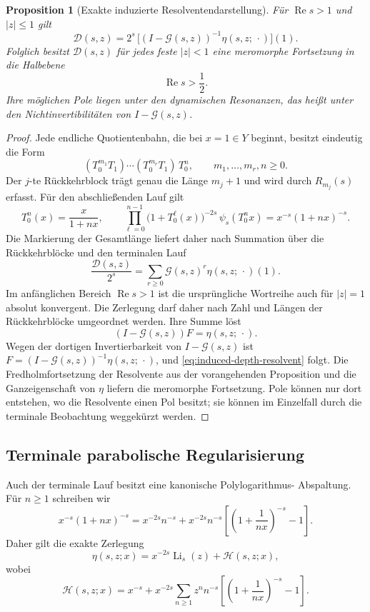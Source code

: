 \documentclass[11pt,a4paper]{article}
\newtheorem{proposition}[remark]{Proposition}
\begin{document}
\begin{proposition}[Exakte induzierte Resolventendarstellung]
Für $\operatorname{Re}s>1$ und $|z|\le1$ gilt
\begin{equation}\label{eq:induced-depth-resolvent}
 \mathscr D(s,z)
 =
 2^s\,
 \bigl[(I-\mathcal G(s,z))^{-1}\eta(s,z;\,\cdot)\bigr](1).
\end{equation}
Folglich besitzt $\mathscr D(s,z)$ für jedes feste $|z|<1$ eine
meromorphe Fortsetzung in die Halbebene
\[
 \operatorname{Re}s>\frac12.
\]
Ihre möglichen Pole liegen unter den dynamischen Resonanzen, das heißt
unter den Nichtinvertibilitäten von $I-\mathcal G(s,z)$.
\end{proposition}

\begin{proof}
Jede endliche Quotientenbahn, die bei $x=1\in Y$ beginnt, besitzt
eindeutig die Form
\[
 (T_0^{m_1}T_1)\cdots(T_0^{m_r}T_1)\,T_0^n,
 \qquad m_1,\ldots,m_r,n\ge0.
\]
Der $j$-te Rückkehrblock trägt genau die Länge $m_j+1$ und wird durch
$R_{m_j}(s)$ erfasst. Für den abschließenden Lauf gilt
\[
 T_0^n(x)=\frac{x}{1+nx},
 \qquad
 \prod_{\ell=0}^{n-1}
  \bigl(1+T_0^\ell(x)\bigr)^{-2s}
 \,\psi_s(T_0^n x)
 =
 x^{-s}(1+nx)^{-s}.
\]
Die Markierung der Gesamtlänge liefert daher nach Summation über die
Rückkehrblöcke und den terminalen Lauf
\[
 \frac{\mathscr D(s,z)}{2^s}
 =
 \sum_{r\ge0}\mathcal G(s,z)^r\eta(s,z;\,\cdot)(1).
\]
Im anfänglichen Bereich $\operatorname{Re}s>1$ ist die ursprüngliche
Wortreihe auch für $|z|=1$ absolut konvergent. Die Zerlegung darf daher nach Zahl und
Längen der Rückkehrblöcke umgeordnet werden. Ihre Summe löst
\[
 (I-\mathcal G(s,z))F=\eta(s,z;\,\cdot).
\]
Wegen der dortigen Invertierbarkeit von $I-\mathcal G(s,z)$ ist
$F=(I-\mathcal G(s,z))^{-1}\eta(s,z;\,\cdot)$, und
\eqref{eq:induced-depth-resolvent} folgt. Die Fredholmfortsetzung der
Resolvente aus der vorangehenden Proposition und die Ganzeigenschaft
von $\eta$ liefern die meromorphe Fortsetzung. Pole können nur dort
entstehen, wo die Resolvente einen Pol besitzt; sie können im Einzelfall
durch die terminale Beobachtung weggekürzt werden.
\end{proof}


\subsection{Terminale parabolische Regularisierung}

Auch der terminale Lauf besitzt eine kanonische Polylogarithmus-
Abspaltung. Für $n\ge1$ schreiben wir
\[
 x^{-s}(1+nx)^{-s}
 =
 x^{-2s}n^{-s}
 +
 x^{-2s}n^{-s}
 \left[
 \left(1+\frac1{nx}\right)^{-s}-1
 \right].
\]
Daher gilt die exakte Zerlegung
\begin{equation}\label{eq:terminal-polylog-regularization}
 \eta(s,z;x)
 =
 x^{-2s}\operatorname{Li}_s(z)+\mathcal H(s,z;x),
\end{equation}
wobei
\[
 \mathcal H(s,z;x)
 =
 x^{-s}
 +
 x^{-2s}\sum_{n\ge1}z^n n^{-s}
 \left[
 \left(1+\frac1{nx}\right)^{-s}-1
 \right].
\]
\end{document}
